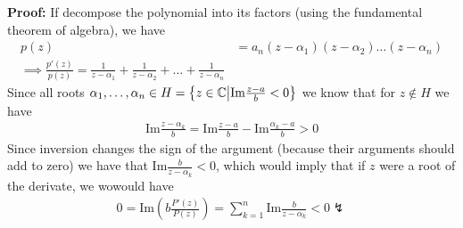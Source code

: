 \textbf{Proof:} If decompose the polynomial into its factors (using the fundamental theorem of algebra), we have
\begin{align*}
				p(z) &= a_n(z - \alpha_1)(z - \alpha_2) \dots (z - \alpha_n)\\
				\implies \frac{p'(z)}{p(z)} = \frac{1}{z - \alpha_1} + \frac{1}{z - \alpha_2} + \ldots + \frac{1}{z - \alpha_n}
\end{align*}
Since all roots $\alpha_{1}, \ldots, \alpha_{n} \in H = \left\{z \in \mathbb{C} \big\vert \text{Im}\frac{z-a}{b} < 0\right\}$ we know that for $z \notin H$ we have
\begin{align*}
				\text{Im}\frac{z - \alpha_k}{b} = \text{Im} \frac{z-a}{b} - \text{Im}\frac{\alpha_k - a}{b} >0
\end{align*}
Since inversion changes the sign of the argument (because their arguments should add to zero) we have that $\text{Im}\frac{b}{z - \alpha_k} < 0$, which would imply that if $z$ were a root of the derivate, we wowould have
\begin{align*}
				0 = \text{Im} \left(b \frac{P'(z)}{P(z)}\right) = \sum_{k=1}^{n} \text{Im}\frac{b}{z - \alpha_k} < 0 \lightning
\end{align*}


